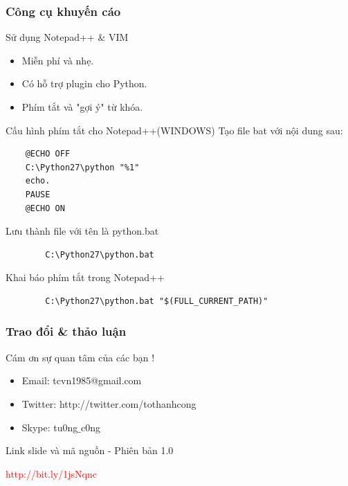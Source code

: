 \documentclass[10pt]{beamer}
\newcommand\sFontvi{\fontsize{8}{7.2}\selectfont} %
\begin{document}
\label{Slide: Cong cu khuyen cao Notepad++}
\begin{frame}[fragile]
\frametitle{Công cụ khuyến cáo}
\begin{block}{Sử dụng Notepad++ \& VIM}
\begin{itemize}
\item Miễn phí và nhẹ.
\item Có hỗ trợ plugin cho Python.
\item Phím tắt và "gợi ý" từ khóa.
\end{itemize}
\end{block}
\sFontvi
\begin{block}{Cấu hình phím tắt cho Notepad++(WINDOWS)}
Tạo file bat với nội dung sau:
\begin{verbatim}
	@ECHO OFF
	C:\Python27\python "%1"
	echo.
	PAUSE
	@ECHO ON
\end{verbatim}
Lưu thành file với tên là python.bat
\noindent 
\begin{verbatim}
 		C:\Python27\python.bat
\end{verbatim} 
Khai báo phím tắt trong Notepad++ 
\begin{verbatim}
		C:\Python27\python.bat "$(FULL_CURRENT_PATH)"
\end{verbatim}
\end{block}
\end{frame}
\label{Trao doi & Thao Luan}
\begin{frame}
\frametitle{Trao đổi \& thảo luận}
\Huge{\centerline{Cám ơn sự quan tâm của các bạn !}}
\space
\sFontvi	
	\begin{itemize}
		\item Email: tcvn1985@gmail.com
		\item Twitter: http://twitter.com/tothanhcong
		\item Skype: tu0ng$\_$c0ng
	\end{itemize}
Link slide và mã nguồn - Phiên bản 1.0
\Huge{\centerline{\textcolor{red}{http://bit.ly/1jsNqnc}}}
\end{frame}
\end{document}
